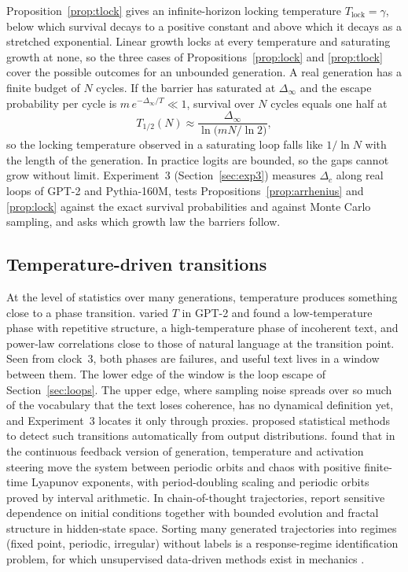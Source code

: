 Proposition~\ref{prop:tlock} gives an infinite-horizon locking temperature $T_{\mathrm{lock}}=\gamma$, below which survival decays to a positive constant and above which it decays as a stretched exponential. Linear growth locks at every temperature and saturating growth at none, so the three cases of Propositions~\ref{prop:lock} and \ref{prop:tlock} cover the possible outcomes for an unbounded generation. A real generation has a finite budget of $N$ cycles. If the barrier has saturated at $\Delta_\infty$ and the escape probability per cycle is $m\,e^{-\Delta_\infty/T}\ll1$, survival over $N$ cycles equals one half at
\begin{equation}
T_{1/2}(N)\approx\frac{\Delta_\infty}{\ln\!\big(mN/\ln2\big)},
\label{eq:thalf}
\end{equation}
so the locking temperature observed in a saturating loop falls like $1/\ln N$ with the length of the generation. In practice logits are bounded, so the gaps cannot grow without limit. Experiment~3 (Section~\ref{sec:exp3}) measures $\Delta_c$ along real loops of GPT-2 and Pythia-160M, tests Propositions~\ref{prop:arrhenius} and \ref{prop:lock} against the exact survival probabilities and against Monte Carlo sampling, and asks which growth law the barriers follow.

\subsection{Temperature-driven transitions}

At the level of statistics over many generations, temperature produces something close to a phase transition. \citet{nakaishi2024phase} varied $T$ in GPT-2 and found a low-temperature phase with repetitive structure, a high-temperature phase of incoherent text, and power-law correlations close to those of natural language at the transition point. Seen from clock~3, both phases are failures, and useful text lives in a window between them. The lower edge of the window is the loop escape of Section~\ref{sec:loops}. The upper edge, where sampling noise spreads over so much of the vocabulary that the text loses coherence, has no dynamical definition yet, and Experiment~3 locates it only through proxies. \citet{arnold2024phase} proposed statistical methods to detect such transitions automatically from output distributions. \citet{jones2026chaos} found that in the continuous feedback version of generation, temperature and activation steering move the system between periodic orbits and chaos with positive finite-time Lyapunov exponents, with period-doubling scaling and periodic orbits proved by interval arithmetic. In chain-of-thought trajectories, \citet{jaca2026chaos} report sensitive dependence on initial conditions together with bounded evolution and fractal structure in hidden-state space. Sorting many generated trajectories into regimes (fixed point, periodic, irregular) without labels is a response-regime identification problem, for which unsupervised data-driven methods exist in mechanics \citep{farid2024unsupervised}.

